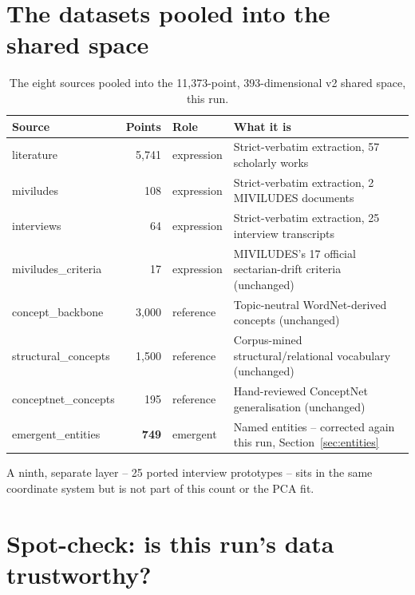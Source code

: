 \documentclass[11pt,a4paper]{article}
\begin{document}
\section{The datasets pooled into the shared space}

\begin{table}[h!]
\centering
\small
\begin{tabularx}{\textwidth}{@{}l r l X@{}}
\toprule
\textbf{Source} & \textbf{Points} & \textbf{Role} & \textbf{What it is} \\
\midrule
literature & 5{,}741 & expression & Strict-verbatim extraction, 57 scholarly works \\
miviludes & 108 & expression & Strict-verbatim extraction, 2 MIVILUDES documents \\
interviews & 64 & expression & Strict-verbatim extraction, 25 interview transcripts \\
miviludes\_criteria & 17 & expression & MIVILUDES's 17 official sectarian-drift criteria (unchanged) \\
concept\_backbone & 3{,}000 & reference & Topic-neutral WordNet-derived concepts (unchanged) \\
structural\_concepts & 1{,}500 & reference & Corpus-mined structural/relational vocabulary (unchanged) \\
conceptnet\_concepts & 195 & reference & Hand-reviewed ConceptNet generalisation (unchanged) \\
emergent\_entities & \textbf{749} & emergent & Named entities -- corrected again this run, Section~\ref{sec:entities} \\
\bottomrule
\end{tabularx}
\caption{The eight sources pooled into the 11{,}373-point, 393-dimensional v2 shared space, this run.}
\end{table}

A ninth, separate layer -- 25 ported interview prototypes -- sits in the
same coordinate system but is not part of this count or the PCA fit.

\section{Spot-check: is this run's data trustworthy?}
\label{sec:spotcheck}
\end{document}
